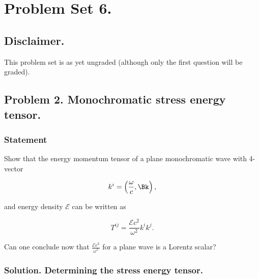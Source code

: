 
%

\chapter{Problem Set 6.}
\label{chap:relElectroDynProblemSet6}
\date{Mar 25, 2011}

\beginArtWithToc

\section{Disclaimer.}

This problem set is as yet ungraded (although only the first question will be graded).



\section{Problem 2.  Monochromatic stress energy tensor.}
\subsection{Statement}

Show that the energy momentum tensor of a plane monochromatic wave with 4-vector

\begin{equation}\label{eqn:relativisticElectrodynamicsPS6:10}
k^i = \left( \frac{\omega}{c}, \Bk \right),
\end{equation}

and energy density $\mathcal{E}$ can be written as

\begin{equation}\label{eqn:relativisticElectrodynamicsPS6:20}
T^{i j} = \frac{\mathcal{E} c^2}{\omega^2} k^i k^j.
\end{equation}

Can one conclude now that $\frac{\mathcal{E} c^2}{\omega^2}$ for a plane wave is a Lorentz scalar?

\subsection{Solution.  Determining the stress energy tensor.}

